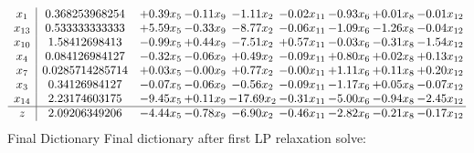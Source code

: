 \documentclass[8pt]{article}
\begin{document}
 \[\begin{array}{c| c c@{\hskip 2pt} c@{\hskip 2pt} c@{\hskip 2pt} c@{\hskip 2pt} c@{\hskip 2pt} c@{\hskip 2pt} c@{\hskip 2pt} }
 x_{1}   &  0.368253968254 & +  0.39 x_{5} & -0.11 x_{9} & -1.11 x_{2} & -0.02 x_{11} & -0.93 x_{6} & +  0.01 x_{8} & -0.01 x_{12}\\
 x_{13}   &  0.533333333333 & +  5.59 x_{5} & -0.33 x_{9} & -8.77 x_{2} & -0.06 x_{11} & -1.09 x_{6} & -1.26 x_{8} & -0.04 x_{12}\\
 x_{10}   &  1.58412698413 & -0.99 x_{5} & +  0.44 x_{9} & -7.51 x_{2} & +  0.57 x_{11} & -0.03 x_{6} & -0.31 x_{8} & -1.54 x_{12}\\
 x_{4}   &  0.084126984127 & -0.32 x_{5} & -0.06 x_{9} & +  0.49 x_{2} & -0.09 x_{11} & +  0.80 x_{6} & +  0.02 x_{8} & +  0.13 x_{12}\\
 x_{7}   &  0.0285714285714 & +  0.03 x_{5} & -0.00 x_{9} & +  0.77 x_{2} & -0.00 x_{11} & +  1.11 x_{6} & +  0.11 x_{8} & +  0.20 x_{12}\\
 x_{3}   &  0.34126984127 & -0.07 x_{5} & -0.06 x_{9} & -0.56 x_{2} & -0.09 x_{11} & -1.17 x_{6} & +  0.05 x_{8} & -0.07 x_{12}\\
 x_{14}   &  2.23174603175 & -9.45 x_{5} & +  0.11 x_{9} & -17.69 x_{2} & -0.31 x_{11} & -5.00 x_{6} & -0.94 x_{8} & -2.45 x_{12}\\
\hline
z    &  2.09206349206 & -4.44 x_{5} & -0.78 x_{9} & -6.90 x_{2} & -0.46 x_{11} & -2.82 x_{6} & -0.21 x_{8} & -0.17 x_{12}\\
\end{array}\]
Final Dictionary
Final dictionary after first LP relaxation solve: 
\end{document}
